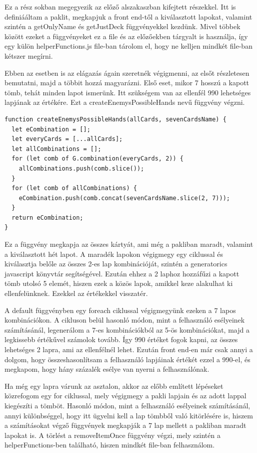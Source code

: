 Ez a rész sokban megegyezik az előző alszakaszban kifejtett részekkel. Itt is definiááltam a paklit, megkapjuk a front end-től a kiválasztott lapokat, valamint szintén a getOnlyName és getJustDeck függvényekkel kezdünk. Mivel többek között ezeket a függvényeket ez a file és az előzőekben tárgyalt is használja, így egy külön helperFunctions.js file-ban tárolom el, hogy ne kelljen mindkét file-ban kétszer megírni.

Ebben az esetben is az elágazás ágain szeretnék végigmenni, az elsőt részletesen bemutatni, majd a többit hozzá magyarázni. Első eset, mikor 7 hosszú a kapott tömb, tehát minden lapot ismerünk. Itt szükségem van az ellenfél 990 lehetséges lapjának az értékére. Ezt a createEnemysPossibleHands nevű függvény végzni.

\begin{lstlisting}[style=htmlcssjs]
function createEnemysPossibleHands(allCards, sevenCardsName) {
  let eCombination = [];
  let everyCards = [...allCards];
  let allCombinations = [];
  for (let comb of G.combination(everyCards, 2)) {
    allCombinations.push(comb.slice());
  }
  for (let comb of allCombinations) {
    eCombination.push(comb.concat(sevenCardsName.slice(2, 7)));
  }
  return eCombination;
}
\end{lstlisting}

Ez a függvény megkapja az összes kártyát, ami még a pakliban maradt, valamint a kiválasztott hét lapot. A maradék lapokon végigmegy egy ciklussal és kiválasztja belőle az összes 2-es lap kombinációját, szintén a generatorics javascript könyvtár segítségével. Ezután ehhez a 2 laphoz hozzáfűzi a kapott tömb utolsó 5 elemét, hiszen ezek a közös lapok, amikkel keze alakulhat ki ellenfelünknek. Ezekkel az értékekkel visszatér.

A default függvényben egy foreach ciklussal végigmegyünk ezeken a 7 lapos kombinációkon. A cikluson belül hasonló módon, mint a felhasználó esélyeinek számításánál, legenerálom a 7-es kombinációkból az 5-ös kombinációkat, majd a legkissebb értékűvel számolok tovább. Így 990 értéket fogok kapni, az összes lehetséges 2 lapra, ami az ellenfélnél lehet. Ezután front end-en már csak annyi a dolgom, hogy összeshasonlítsam a felhasználó lapjáinak értékét ezzel a 990-el, és megkapom, hogy hány százalék esélye van nyerni a felhasználónak.

Ha még egy lapra várunk az asztalon, akkor az előbb említett lépéseket közrefogom egy for ciklussal, mely végigmegy a pakli lapjain és az adott lappal kiegészíti a tömböt. Hasonló módon, mint a felhasználó esélyeinek számításánál, annyi különbséggel, hogy itt ügyelni kell a lap tömbből való kitörlésére is, hiszem a számításokat végző függvények megkapják a 7 lap mellett a pakliban maradt lapokat is. A törlést a removeItemOnce függvény végzi, mely szintén a helperFunctions-ben található, hiszen mindkét file-ban felhasználom.

